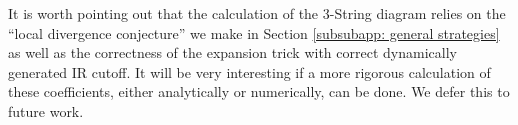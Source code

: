 \documentclass[prx,amsmath,amssymb, notitlepage, onecolumn,
nofootinbib,
superscriptaddress,
longbibliography
]{revtex4-1}
\begin{document}
It is worth pointing out that the calculation of the 3-String diagram relies on the ``local divergence conjecture'' we make in Section \ref{subsubapp: general strategies} as well as the correctness of the expansion trick with correct dynamically generated IR cutoff. It will be very interesting if a more rigorous calculation of these coefficients, either analytically or numerically, can be done. We defer this to future work.

 
\end{document}
